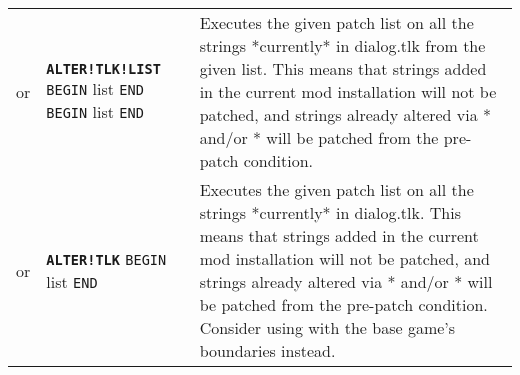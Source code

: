 \documentclass{article}
\def\ttref#1{\ahrefloc{#1}{\tt #1}}
\def\DEFINE#1{{\tt \bf #1}\label{#1}\index{#1}}
\def\t#1{{\tt #1}}
\def\Slist{{\color{red} list }}
\begin{document}
\begin{tabular}{cp{10in}|p{10in}}
or & \DEFINE{ALTER!TLK!LIST} \t{BEGIN} \ttref{value} \Slist \t{END} \t{BEGIN} \ttref{patch} \Slist \t{END} &
		Executes the given patch list on all the strings *currently* in dialog.tlk from the given list.
		This means that strings added in the current mod installation will not
		be patched, and strings already altered via \ttref{ALTER!TLK}* and/or \ttref{STRING!SET}*
		will be patched from the pre-patch condition. \\

	or & \DEFINE{ALTER!TLK} \t{BEGIN} \ttref{patch} \Slist \t{END} &
		Executes the given patch list on all the strings *currently* in dialog.tlk.
		This means that strings added in the current mod installation will not
		be patched, and strings already altered via \ttref{ALTER!TLK}* and/or \ttref{STRING!SET}*
		will be patched from the pre-patch condition. Consider using
		\ttref{ALTER!TLK!RANGE} with the base game's boundaries instead. \\


\end{tabular}
\end{document}
